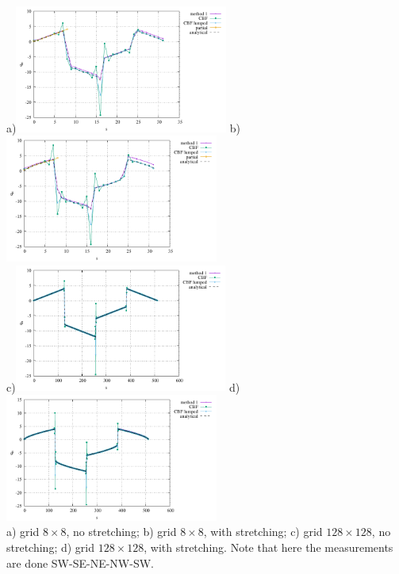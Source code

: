 \begin{center}
a)\includegraphics[width=7cm]{python_codes/fieldstone_173/results/exp1/CBF1/heat_flux_boundary.pdf}
b)\includegraphics[width=7cm]{python_codes/fieldstone_173/results/exp1/CBF2/heat_flux_boundary.pdf}\\
c)\includegraphics[width=7cm]{python_codes/fieldstone_173/results/exp1/CBF3/heat_flux_boundary.pdf}
d)\includegraphics[width=7cm]{python_codes/fieldstone_173/results/exp1/CBF4/heat_flux_boundary.pdf}\\
{\captionfont a) grid $8\times 8$, no stretching; b) grid $8\times 8$, with stretching;
c) grid $128\times 128$, no stretching; d) grid $128\times 128$, with stretching. 
Note that here the measurements are done SW-SE-NE-NW-SW.}
\end{center}

